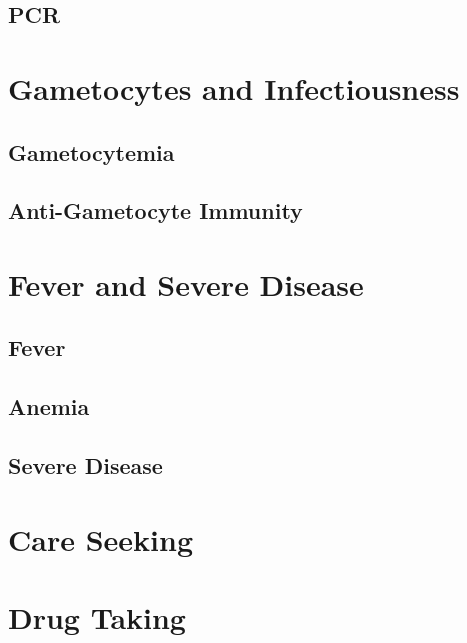 \documentclass[
]{book}
\begin{document}
\hypertarget{pcr}{%
\section{PCR}\label{pcr}}

\hypertarget{gametocytes-and-infectiousness}{%
\chapter{Gametocytes and Infectiousness}\label{gametocytes-and-infectiousness}}

\hypertarget{gametocytemia}{%
\section{Gametocytemia}\label{gametocytemia}}

\hypertarget{anti-gametocyte-immunity}{%
\section{Anti-Gametocyte Immunity}\label{anti-gametocyte-immunity}}

\hypertarget{fever-and-severe-disease}{%
\chapter{Fever and Severe Disease}\label{fever-and-severe-disease}}

\hypertarget{fever}{%
\section{Fever}\label{fever}}

\hypertarget{anemia}{%
\section{Anemia}\label{anemia}}

\hypertarget{severe-disease}{%
\section{Severe Disease}\label{severe-disease}}

\hypertarget{care-seeking}{%
\chapter{Care Seeking}\label{care-seeking}}

\hypertarget{drug-taking}{%
\chapter{Drug Taking}\label{drug-taking}}
\end{document}
